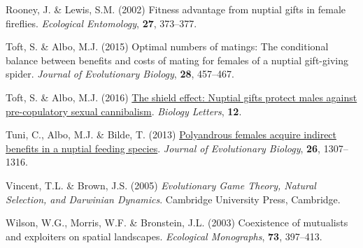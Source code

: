\documentclass[
]{article}
\newlength{\cslhangindent}
\newlength{\cslentryspacingunit} %
\newenvironment{CSLReferences}[2] %
 {%
  \setlength{\parindent}{0pt}
  \ifodd #1
  \let\oldpar\par
  \def\par{\hangindent=\cslhangindent\oldpar}
  \fi
  \setlength{\parskip}{#2\cslentryspacingunit}
 }%
 {}
\begin{document}
\begin{CSLReferences}{0}{0}
\leavevmode{}%
Rooney, J. \& Lewis, S.M. (2002) Fitness advantage from nuptial gifts in
female fireflies. \emph{Ecological Entomology}, \textbf{27}, 373--377.

\leavevmode{}%
Toft, S. \& Albo, M.J. (2015) Optimal numbers of matings: The
conditional balance between benefits and costs of mating for females of
a nuptial gift-giving spider. \emph{Journal of Evolutionary Biology},
\textbf{28}, 457--467.

\leavevmode{}%
Toft, S. \& Albo, M.J. (2016)
\href{https://doi.org/10.1098/rsbl.2015.1082}{{The shield effect:
Nuptial gifts protect males against pre-copulatory sexual cannibalism}}.
\emph{Biology Letters}, \textbf{12}.

\leavevmode{}%
Tuni, C., Albo, M.J. \& Bilde, T. (2013)
\href{https://doi.org/10.1111/jeb.12137}{{Polyandrous females acquire
indirect benefits in a nuptial feeding species}}. \emph{Journal of
Evolutionary Biology}, \textbf{26}, 1307--1316.

\leavevmode{}%
Vincent, T.L. \& Brown, J.S. (2005) \emph{{Evolutionary Game Theory,
Natural Selection, and Darwinian Dynamics}}. Cambridge University Press,
Cambridge.

\leavevmode{}%
Wilson, W.G., Morris, W.F. \& Bronstein, J.L. (2003) {Coexistence of
mutualists and exploiters on spatial landscapes}. \emph{Ecological
Monographs}, \textbf{73}, 397--413.

\end{CSLReferences}
\end{document}

